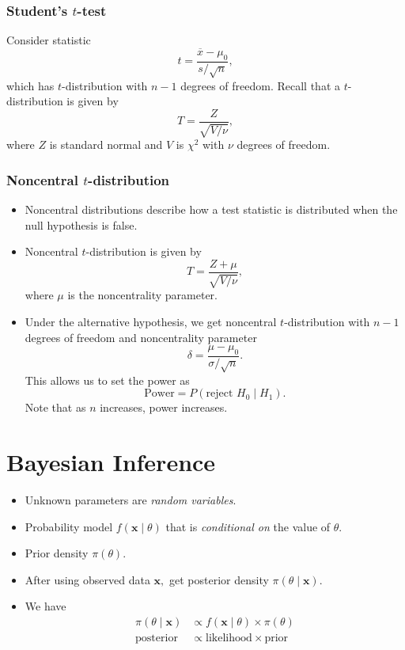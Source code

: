 \subsubsection{Student's $t$-test}
Consider statistic
\[ t = \frac{\overline{x} - \mu_0}{s/\sqrt{n}}, \]
which has $t$-distribution with $n-1$ degrees of freedom. Recall that a $t$-distribution is given by \[ T = \frac{Z}{\sqrt{V/\nu}}, \]
where $Z$ is standard normal and $V$ is $\chi^2$ with $\nu$ degrees of freedom.

\subsubsection{Noncentral $t$-distribution}
\begin{itemize}
	\item Noncentral distributions describe how a test statistic is distributed when the null hypothesis is false.
	\item Noncentral $t$-distribution is given by
	\[ T = \frac{Z+\mu}{\sqrt{V/\nu}}, \]
	where $\mu$ is the noncentrality parameter.
	\item Under the alternative hypothesis, we get noncentral $t$-distribution with $n-1$ degrees of freedom and noncentrality parameter
	\[ \delta = \frac{\mu - \mu_0}{\sigma/\sqrt{n}}. \]
	This allows us to set the power as
	\[ \text{Power} = P(\text{reject }H_0 \mid H_1). \]
	Note that as $n$ increases, power increases.
\end{itemize}

\section{Bayesian Inference}
\begin{itemize}
	\item Unknown parameters are \textit{random variables}.
	\item Probability model $f(\mathbf{x} \mid \theta)$ that is \textit{conditional on} the value of $\theta.$
	\item Prior density $\pi(\theta).$
	\item After using observed data $\mathbf{x},$ get posterior density $\pi(\theta \mid \mathbf{x}).$
	\item We have
	\begin{align*}
		\pi(\theta \mid \mathbf{x}) &\propto f(\mathbf{x} \mid \theta) \times \pi(\theta) \\
		\text{posterior} &\propto \text{likelihood} \times \text{prior}
	\end{align*}
\end{itemize}

